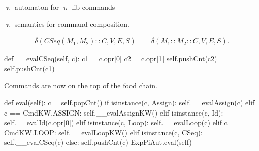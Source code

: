 \documentclass{beamer}
\begin{document}
\begin{frame}{{\color{red}$\uppi$ automaton} for {\color{red}$\uppi$ lib} commands}
\framebreak

{\color{red}$\uppi$}  semantics for command composition.

\begin{scriptsize}
\begin{align}
\delta(CSeq(M_1, M_2) :: C, V, E, S) & = \delta(M_1 :: M_2 :: C, V, E, S). \nonumber
\end{align}
\end{scriptsize}

\begin{python}
    def __evalCSeq(self, c):
        c1 = c.opr[0]
        c2 = c.opr[1]
        self.pushCnt(c2)
        self.pushCnt(c1)
\end{python}

\framebreak

Commands are now on the top of the food chain.

\begin{python}
    def eval(self): 
        c = self.popCnt()
        if isinstance(c, Assign):
            self.__evalAssign(c)
        elif c == CmdKW.ASSIGN:
            self.__evalAssignKW()
        elif isinstance(c, Id):
            self.__evalId(c.opr[0])
        elif isinstance(c, Loop):
            self.__evalLoop(c)
        elif c == CmdKW.LOOP:
            self.__evalLoopKW()
        elif isinstance(c, CSeq):
            self.__evalCSeq(c)
        else:
            self.pushCnt(c)
            ExpPiAut.eval(self)
\end{python}
\end{frame}

\end{document}
